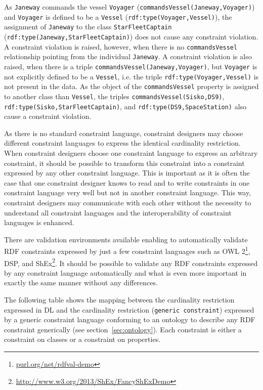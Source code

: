 \documentclass{llncs}
\newcommand{\ms}[1]{\texttt{#1}}
\begin{document}
As \ms{Janeway} commands the vessel \ms{Voyager} (\ms{commandsVessel(Janeway,Voyager)}) and \ms{Voyager} is defined to be a \ms{Vessel} (\ms{rdf:type(Voyager,Vessel)}), the assignment of \ms{Janeway} to the class \ms{StarFleetCaptain} (\ms{rdf:type(Janeway,StarFleetCaptain)}) does not cause any constraint violation.
A constraint violation is raised, however, when there is no \ms{commandsVessel} relationship pointing from the individual \ms{Janeway}. 
A constraint violation is also raised, when there is a triple \ms{commandsVessel(Janeway,Voyager)}, but \ms{Voyager} is not explicitly defined to be a \ms{Vessel}, 
i.e. the triple \ms{rdf:type(Voyager,Vessel)} is not present in the data. 
As the object of the \ms{commandsVessel} property is assigned to another class than \ms{Vessel}, 
the triples \ms{commandsVessel(Sisko,DS9)}, \ms{rdf:type(Sisko,StarFleetCaptain)}, and \ms{rdf:type(DS9,SpaceStation)}  
also cause a constraint violation.

As there is no standard constraint language, constraint designers may choose different constraint languages to express the identical cardinality restriction. 
When constraint designers choose one constraint language to express an arbitrary constraint, it should be possible to transform this constraint into a constraint expressed by any other constraint language. 
This is important as it is often the case that one constraint designer knows to read and to write constraints in one constraint language very well but not in another constraint language. 
This way, constraint designers may communicate with each other without the necessity to understand all constraint languages and the interoperability of constraint languages is enhanced.


There are validation environments available enabling to automatically validate RDF constraints expressed by just a few constraint languages such as OWL 2\footnote{\url{purl.org/net/rdfval-demo}\label{footnote1}}, DSP, and ShEx\footnote{\url{http://www.w3.org/2013/ShEx/FancyShExDemo}}.
It should be possible to validate any RDF constraints expressed by any constraint language automatically and what is even more important in exactly the same manner without any differences.  

The following table shows the mapping between the cardinality restriction expressed in DL and the cardinality restriction (\ms{generic constraint}) expressed by a generic constraint language conforming to an ontology to describe any RDF constraint generically (see section~\ref{sec:ontology}).
Each constraint is either a constraint on classes or a constraint on properties.
\end{document}
